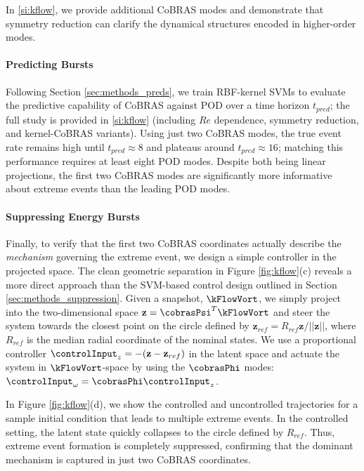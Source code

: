 \documentclass[twocolumn,10pt]{article}
\begin{document}
In \ref{si:kflow}, we provide additional CoBRAS modes and demonstrate that symmetry reduction can clarify the dynamical structures encoded in higher-order modes.


\paragraph{Predicting Bursts}
Following Section \ref{sec:methods_preds}, we train RBF-kernel SVMs to evaluate the predictive capability of CoBRAS against POD over a time horizon $t_{pred}$; the full study is provided in \ref{si:kflow} (including $Re$ dependence, symmetry reduction, and kernel-CoBRAS variants). Using just two CoBRAS modes, the true event rate remains high until $t_{pred} \approx 8$ and plateaus around $t_{pred} \approx 16$; matching this performance requires at least eight POD modes. Despite both being linear projections, the first two {CoBRAS modes are significantly more informative about extreme events than the leading POD modes}.



\paragraph{Suppressing Energy Bursts}
Finally, to verify that the first two CoBRAS coordinates actually describe the \textit{mechanism} governing the extreme event, we design a simple controller in the projected space. 
The clean geometric separation in Figure \ref{fig:kflow}(c) reveals a more direct approach than the SVM-based control design outlined in Section \ref{sec:methods_suppression}. 
Given a snapshot, $\kFlowVort$, we simply project into the two-dimensional space $\mathbf z = \cobrasPsi^T \kFlowVort$ and steer the system towards the closest point on the circle defined by $\mathbf z_{ref} = R_{ref} \mathbf z /||\mathbf z||$, where $ R_{ref}$ is the median radial coordinate of the nominal states. We 
use a proportional controller $\controlInput_z = -(\mathbf z - \mathbf z_{ref})$ in the latent space and
actuate the system in $\kFlowVort$-space by using the $\cobrasPhi$ modes: $\controlInput_\omega = \cobrasPhi \controlInput_z$.

In Figure \ref{fig:kflow}(d), we show the controlled and uncontrolled trajectories for a sample initial condition that leads to multiple extreme events. In the controlled setting, the latent state quickly collapses to the circle defined by $R_{ref}$.  Thus, extreme event formation is completely suppressed, confirming that the dominant mechanism is captured in just two CoBRAS coordinates.
%
\end{document}
